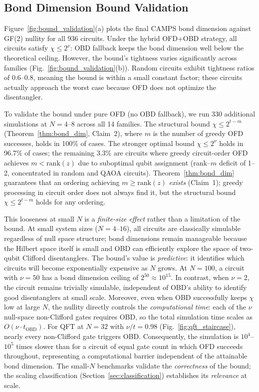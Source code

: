 \documentclass[a4paper,twocolumn,11pt]{quantumarticle}
\begin{document}
\subsection{Bond Dimension Bound Validation}
\label{sec:bound_tightness}

Figure~\ref{fig:bound_validation}(a) plots the final CAMPS bond dimension against GF(2) nullity for all 936 circuits.
Under the hybrid OFD+OBD strategy, all circuits satisfy $\chi \le 2^\nu$: OBD fallback keeps the bond dimension well below the theoretical ceiling.
However, the bound's tightness varies significantly across families (Fig.~\ref{fig:bound_validation}(b)).
Random circuits exhibit tightness ratios of $0.6$--$0.8$, meaning the bound is within a small constant factor; these circuits actually approach the worst case because OFD does not optimize the disentangler.

To validate the bound under pure OFD (no OBD fallback), we run 330 additional simulations at $N = 4$--$8$ across all 14 families.
The structural bound $\chi \le 2^{t-m}$ (Theorem~\ref{thm:bond_dim}, Claim~2), where $m$ is the number of greedy OFD successes, holds in 100\% of cases.
The stronger optimal bound $\chi \le 2^\nu$ holds in 96.7\% of cases; the remaining 3.3\% are circuits where greedy circuit-order OFD achieves $m < \mathrm{rank}(z)$ due to suboptimal qubit assignment (rank--$m$ deficit of 1--2, concentrated in random and QAOA circuits).
Theorem~\ref{thm:bond_dim} guarantees that an ordering achieving $m \ge \mathrm{rank}(z)$ \emph{exists} (Claim~1); greedy processing in circuit order does not always find it, but the structural bound $\chi \le 2^{t-m}$ holds for any ordering.

This looseness at small $N$ is a \emph{finite-size effect} rather than a limitation of the bound.
At small system sizes ($N = 4$--$16$), all circuits are classically simulable regardless of null space structure; bond dimensions remain manageable because the Hilbert space itself is small and OBD can efficiently explore the space of two-qubit Clifford disentanglers.
The bound's value is \emph{predictive}: it identifies which circuits will become exponentially expensive as $N$ grows.
At $N = 100$, a circuit with $\nu = 50$ has a bond dimension ceiling of $2^{50} \approx 10^{15}$. In contrast, when $\nu = 2$, the circuit remains trivially simulable, independent of OBD's ability to identify good disentanglers at small scale.
Moreover, even when OBD successfully keeps $\chi$ low at large $N$, the nullity directly controls the \emph{computational time}: each of the $\nu$ null-space non-Clifford gates requires OBD, so the total simulation time scales as $O(\nu \cdot t_{\mathrm{OBD}})$.
For QFT at $N = 32$ with $\nu/t = 0.98$ (Fig.~\ref{fig:qft_staircase}), nearly every non-Clifford gate triggers OBD. Consequently, the simulation is $10^4$--$10^5$ times slower than for a circuit of equal gate count in which OFD succeeds throughout, representing a computational barrier independent of the attainable bond dimension.
The small-$N$ benchmarks validate the \emph{correctness} of the bound; the scaling classification (Section~\ref{sec:classification}) establishes its \emph{relevance} at scale.
\end{document}
